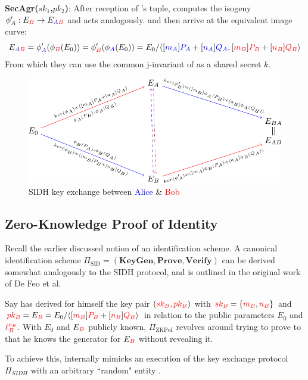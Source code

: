 \noindent
\textbf{SecAgr($sk_{1}$,$pk_{2}$)}: After reception of \bob's tuple, \alice computes the isogeny $\phi'_A: E_{\textcolor{red}{B}} \rightarrow E_{\textcolor{blue}{A}\textcolor{red}{B}}$ and \bob acts analogously. \alice and \bob then arrive at the equivalent image curve:
$$
E_{\textcolor{blue}{A}\textcolor{red}{B}} = \phi'_{\textcolor{blue}{A}}(\phi_{\textcolor{red}{B}}(E_0)) = \phi'_{\textcolor{red}{B}}(\phi_{\textcolor{blue}{A}}(E_0)) = E_0/ \langle [\textcolor{blue}{m_A}]\textcolor{blue}{P_A} + [\textcolor{blue}{n_A}]\textcolor{blue}{Q_A}, [\textcolor{red}{m_B}]\textcolor{red}{P_B} + [\textcolor{red}{n_B}]\textcolor{red}{Q_B} \rangle
$$
From which they can use the common j-invariant of as a shared secret $k$.

\begin{figure}[htb]
\centering
\includegraphics[scale=0.5]{keyexchange.png} %
\caption{SIDH key exchange between \textcolor{blue}{Alice} \& \textcolor{red}{Bob}}
\label{fig:kex} %
\end{figure}

\subsection{Zero-Knowledge Proof of Identity}

Recall the earlier discussed notion of an identification scheme. A canonical identification scheme $\Pi_{\text{SID}} = (\textbf{KeyGen},\textbf{Prove},\textbf{Verify})$ can be derived somewhat analogously to the SIDH protocol, and is outlined in the original work of De Feo et al.

Say \bob has derived for himself the key pair $(\textcolor{red}{sk_B},\textcolor{red}{pk_B})$ with $\textcolor{red}{sk_B} = \{\textcolor{red}{m_B},\textcolor{red}{n_B}\}$ and $\textcolor{red}{pk_B} = E_{\textcolor{red}{B}} = E_0/\langle [\textcolor{red}{m_B}]\textcolor{red}{P_B} + [\textcolor{red}{n_B}]\textcolor{red}{Q_B} \rangle$ in relation to the public parameters $E_0$ and $\textcolor{red}{\ell_{B}^{e_B}}$. With $E_0$ and $E_{\textcolor{red}{B}}$ publicly known, $\Pi_{\text{ZKPoI}}$ revolves around \bob trying to prove to \alice that he knows the generator for $E_{\textcolor{red}{B}}$ without revealing it.

To achieve this, \bob internally mimicks an execution of the key exchange protocol $\Pi_{SIDH}$ with an arbitrary ``random" entity \randall.\\

